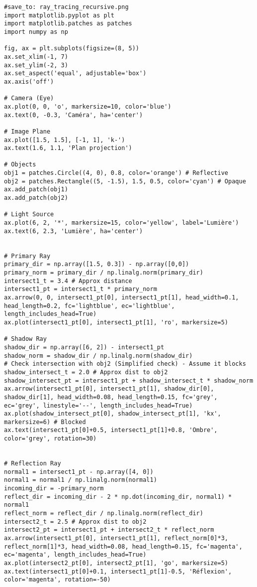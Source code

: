 \documentclass{article}
\begin{document}
\begin{verbatim}
#save_to: ray_tracing_recursive.png
import matplotlib.pyplot as plt
import matplotlib.patches as patches
import numpy as np

fig, ax = plt.subplots(figsize=(8, 5))
ax.set_xlim(-1, 7)
ax.set_ylim(-2, 3)
ax.set_aspect('equal', adjustable='box')
ax.axis('off')

# Camera (Eye)
ax.plot(0, 0, 'o', markersize=10, color='blue')
ax.text(0, -0.3, 'Caméra', ha='center')

# Image Plane
ax.plot([1.5, 1.5], [-1, 1], 'k-')
ax.text(1.6, 1.1, 'Plan projection')

# Objects
obj1 = patches.Circle((4, 0), 0.8, color='orange') # Reflective
obj2 = patches.Rectangle((5, -1.5), 1.5, 0.5, color='cyan') # Opaque
ax.add_patch(obj1)
ax.add_patch(obj2)

# Light Source
ax.plot(6, 2, '*', markersize=15, color='yellow', label='Lumière')
ax.text(6, 2.3, 'Lumière', ha='center')


# Primary Ray
primary_dir = np.array([1.5, 0.3]) - np.array([0,0])
primary_norm = primary_dir / np.linalg.norm(primary_dir)
intersect1_t = 3.4 # Approx distance
intersect1_pt = intersect1_t * primary_norm
ax.arrow(0, 0, intersect1_pt[0], intersect1_pt[1], head_width=0.1, head_length=0.2, fc='lightblue', ec='lightblue', length_includes_head=True)
ax.plot(intersect1_pt[0], intersect1_pt[1], 'ro', markersize=5)

# Shadow Ray
shadow_dir = np.array([6, 2]) - intersect1_pt
shadow_norm = shadow_dir / np.linalg.norm(shadow_dir)
# Check intersection with obj2 (Simplified check) - Assume it blocks
shadow_intersect_t = 2.0 # Approx dist to obj2
shadow_intersect_pt = intersect1_pt + shadow_intersect_t * shadow_norm
ax.arrow(intersect1_pt[0], intersect1_pt[1], shadow_dir[0], shadow_dir[1], head_width=0.08, head_length=0.15, fc='grey', ec='grey', linestyle='--', length_includes_head=True)
ax.plot(shadow_intersect_pt[0], shadow_intersect_pt[1], 'kx', markersize=6) # Blocked
ax.text(intersect1_pt[0]+0.5, intersect1_pt[1]+0.8, 'Ombre', color='grey', rotation=30)


# Reflection Ray
normal1 = intersect1_pt - np.array([4, 0])
normal1 = normal1 / np.linalg.norm(normal1)
incoming_dir = -primary_norm
reflect_dir = incoming_dir - 2 * np.dot(incoming_dir, normal1) * normal1
reflect_norm = reflect_dir / np.linalg.norm(reflect_dir)
intersect2_t = 2.5 # Approx dist to obj2
intersect2_pt = intersect1_pt + intersect2_t * reflect_norm
ax.arrow(intersect1_pt[0], intersect1_pt[1], reflect_norm[0]*3, reflect_norm[1]*3, head_width=0.08, head_length=0.15, fc='magenta', ec='magenta', length_includes_head=True)
ax.plot(intersect2_pt[0], intersect2_pt[1], 'go', markersize=5)
ax.text(intersect1_pt[0]+0.1, intersect1_pt[1]-0.5, 'Réflexion', color='magenta', rotation=-50)



\end{verbatim}
\end{document}
